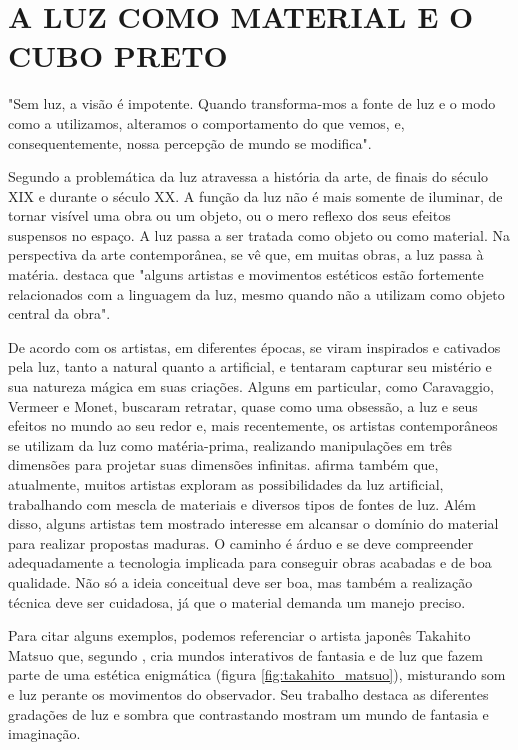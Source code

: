 \chapter{A LUZ COMO MATERIAL E O CUBO PRETO}

\begin{citacao}
"Sem luz, a visão é impotente. Quando transforma-mos a fonte de luz e o modo como a utilizamos, alteramos o comportamento do que vemos, e, consequentemente, nossa percepção de mundo se modifica". \cite[p. 48]{brandi}
\end{citacao}

Segundo  a problemática da luz atravessa a história da arte, de finais do século XIX e durante o século XX. A função da luz não é mais somente de iluminar, de tornar visível uma obra ou um objeto, ou o mero reflexo dos seus efeitos suspensos no espaço. A luz passa a ser tratada como objeto ou como material. Na perspectiva da arte contemporânea, se vê que, em muitas obras, a luz passa à matéria.  destaca que "alguns artistas e movimentos estéticos estão fortemente relacionados com a linguagem da luz, mesmo quando não a utilizam como objeto central da obra". 

De acordo com  os artistas, em diferentes épocas, se viram inspirados e cativados pela luz, tanto a natural quanto a artificial, e tentaram capturar seu mistério e sua natureza mágica em suas criações. Alguns em particular, como Caravaggio, Vermeer e Monet, buscaram retratar, quase como uma obsessão, a luz e seus efeitos no mundo ao seu redor e, mais recentemente, os artistas contemporâneos se utilizam da luz como matéria-prima, realizando manipulações em três dimensões para projetar suas dimensões infinitas.  afirma também que, atualmente, muitos artistas exploram as possibilidades da luz artificial, trabalhando com mescla de materiais e diversos tipos de fontes de luz. Além disso, alguns artistas tem mostrado interesse em alcansar o domínio do material para realizar propostas maduras. O caminho é árduo e se deve compreender adequadamente a tecnologia implicada para conseguir obras acabadas e de boa qualidade. Não só a ideia conceitual deve ser boa, mas também a realização técnica deve ser cuidadosa, já que o material demanda um manejo preciso.

Para citar alguns exemplos, podemos referenciar o artista japonês Takahito Matsuo que, segundo , cria mundos interativos de fantasia e de luz que fazem parte de uma estética enigmática (figura \ref{fig:takahito_matsuo}), misturando som e luz perante os movimentos do observador. Seu trabalho destaca as diferentes gradações de luz e sombra que contrastando mostram um mundo de fantasia e imaginação.

